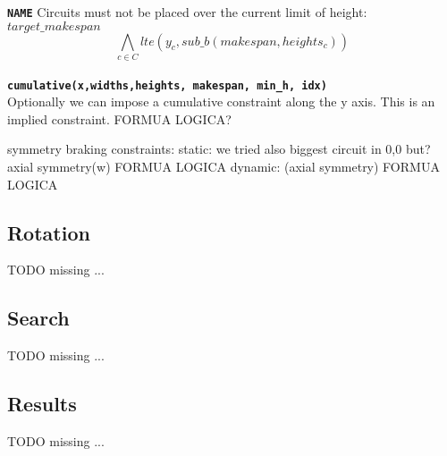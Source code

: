 \texttt\textbf{NAME} Circuits must not be placed over the current limit of height: 
$target\_makespan$ \\
\begin{equation}
    \bigwedge\limits_{c \in C} lte(y_c, sub\_b(makespan, heights_c))
\end{equation}\\

\texttt\textbf{cumulative(x,widths,heights, makespan, min\_h, idx)} \\
Optionally we can impose a cumulative constraint along the y axis. This is an implied
constraint. FORMUA LOGICA?

symmetry braking constraints: 
static: 
     we tried also biggest circuit in 0,0 but?
    axial symmetry(w) FORMUA LOGICA
dynamic: (axial symmetry) FORMUA LOGICA



\subsection{Rotation}\label{subsec:rotation}
    \colorbox{BurntOrange}{TODO missing ...}


\subsection{Search}\label{subsec:search}
    \colorbox{BurntOrange}{TODO missing ...}


\subsection{Results}\label{subsec:results}
    \colorbox{BurntOrange}{TODO missing ...}
